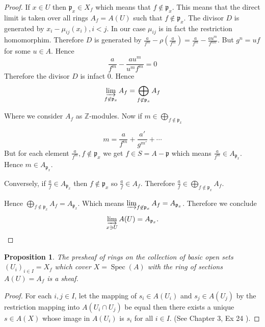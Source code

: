 \documentclass[]{report}
\newtheorem{prop}[theorem]{Proposition}
\DeclareMathOperator\Spec{Spec}
\begin{document}
\begin{proof}
    If $x \in U$ then $\mathfrak{p}_x \in X_f$ which means that $f \not \in \mathfrak{p}_x$. This means that the direct limit is taken over all rings $A_f = A(U)$ such that $f \not \in \mathfrak{p}_x$.
    The divisor $D$ is generated by $x_i - \mu_{ij}(x_i), i < j$. In our case $\mu_{ij}$ is in fact the restriction homomorphim. Therefore $D$ is generated by $\frac{a}{f^m} - \rho(\frac{a}{f^m}) = \frac{a}{f^m} - \frac{au^m}{f^{mn}}$. But $g^n = uf$ for some $u \in A$. Hence
    $$\frac{a}{f^m} - \frac{au^m}{u^m f^m} = 0$$
Therefore the divisor $D$ is infact $0$. Hence
    $$\varinjlim_{f \not \in \mathfrak{p}_x} A_f = \bigoplus_{f \not \in \mathfrak{p}_x} A_f$$

    Where we consider $A_f$ as $\mathbb{Z}$-modules. 
    Now if $m \in \bigoplus_{f \not \in \mathfrak{p}_x}$

        $$m = \frac{a}{f^m} + \frac{a'}{g^{m'}} + \cdots$$
    But for each element $\frac{a}{f^m}, f \not \in \mathfrak{p}_x$ we get $f \in S = A - \mathfrak{p}$ which means $\frac{a}{f^m} \in A_{\mathfrak{p}_x}$. Hence $m \in A_{\mathfrak{p}_x}$.

    Conversely, if $\frac{a}{f} \in A_{\mathfrak{p}_x}$ then $f \not \in \mathfrak{p}_x$ so $\frac{a}{f} \in A_f$. Therefore $\frac{a}{f} \in \bigoplus_{f \not \in \mathfrak{p}_x} A_f$.

    Hence $\bigoplus_{f \not \in \mathfrak{p}_x} A_f = A_{\mathfrak{p}_x}$. Which means $\varinjlim_{f \not \in \mathfrak{p}_x} A_f = A_{\mathfrak{p}_x}$. Therefore we conclude
    $$\varinjlim_{x \ni U} A(U) = A_{\mathfrak{p}_x}.$$

\end{proof}

\begin{prop}
    The presheaf of rings on the collection of basic open sets $(U_i)_{i \in I} = X_f$ which cover $X = \Spec(A)$ with the ring of sections $A(U) = A_f$ is a \textit{sheaf}. 
\end{prop}

\begin{proof}
    For each $i,j \in I$, let the mapping of $s_i \in A(U_i)$ and $s_j \in A(U_j)$ by the restriction mapping into $A(U_i \cap U_j)$ be equal then there exists a unique $s \in A(X)$ whose image in $A(U_i)$ is $s_i$ for all $i \in I$. (See Chapter 3, Ex 24 \cite{atiyah1}). 
\end{proof}

\end{document}
